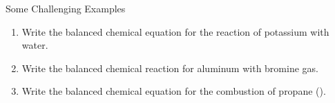 \documentclass[11pt,letterpaper]{article}
\begin{document}
\clearpage

\begin{frame}[t]{Some Challenging Examples}
	\begin{enumerate}[<only@+>]
		\item Write the balanced chemical equation for the reaction of
			potassium with water.

			\vfill


		\item Write the balanced chemical reaction for aluminum with
			bromine gas.

			\vfill


		\item Write the balanced chemical equation for the combustion of
			propane ().

			\vfill

	\end{enumerate}
\end{frame}
\end{document}
